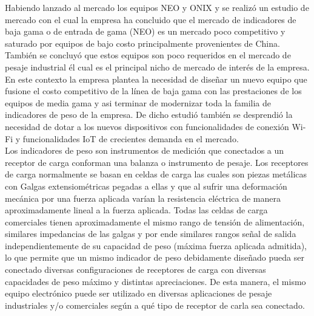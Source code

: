 \documentclass[11pt]{charter}
\begin{document}
Habiendo lanzado al mercado los equipos NEO y ONIX y se realizó un estudio de mercado con el cual la empresa ha concluido que el mercado de indicadores de baja gama o de entrada de gama (NEO) es un mercado poco competitivo y saturado por equipos de bajo costo principalmente provenientes de China. También se concluyó  que estos equipos son poco requeridos en el mercado de pesaje industrial él cual es el principal nicho de mercado de interés de la empresa. En este contexto la empresa plantea la necesidad de diseñar un nuevo equipo que fusione el costo competitivo de la línea de baja gama con las prestaciones de los equipos de media gama y asi terminar de modernizar toda la familia de indicadores de peso de la empresa. De dicho estudió  también se desprendió la necesidad de dotar a los nuevos dispositivos con funcionalidades de conexión Wi-Fi y funcionalidades IoT de crecientes demanda en el mercado.\\

Los indicadores de peso son instrumentos de medición que conectados a un receptor de carga conforman una balanza o instrumento de pesaje. Los receptores de carga normalmente se basan en celdas de carga las cuales son piezas metálicas con Galgas extensiométricas pegadas a ellas y que al sufrir una deformación mecánica por una fuerza aplicada varían la resistencia eléctrica de manera aproximadamente lineal a la fuerza aplicada. Todas las celdas de carga comerciales tienen aproximadamente el mismo rango de tensión de alimentación, similares impedancias de las galgas y por ende similares rangos señal de salida independientemente de su capacidad de peso (máxima fuerza aplicada admitida), lo que permite que un mismo indicador de peso debidamente diseñado pueda ser conectado diversas configuraciones de receptores de carga con diversas capacidades de peso máximo y distintas apreciaciones. De esta manera, el mismo equipo electrónico puede ser utilizado en diversas aplicaciones de pesaje industriales y/o comerciales según a qué tipo de receptor de carla sea conectado.
\end{document}
